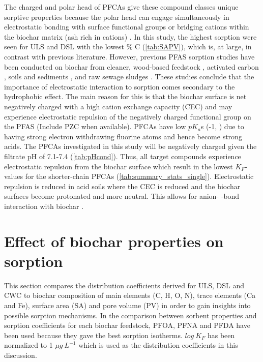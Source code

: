 The charged and polar head of PFCAs give these compound classes unique sorptive properties because the polar head can engage simultaneously in electrostatic bonding with surface functional groups or bridging cations within the biochar matrix (ash rich in cations) \citep{zhang2013sorption,sigmund2022sorption}. In this study, the highest sorption were seen for ULS and DSL with the lowest \% C (\cref{tab:SAPV}), which is, at large, in contrast with previous literature. However, previous PFAS sorption studies have been conducted on biochar from cleaner, wood-based feedstock \citep{Sormo2021}, activated carbon \citep{zhang2021sorption,Kupryianchyk2016b}, soils and sediments \citep{higgins2006sorption}, and raw sewage sludges \citep{zhang2013sorption}. These studies conclude that the importance of electrostatic interaction to sorption comes secondary to the hydrophobic effect. The main reason for this is that the biochar surface is net negatively charged with a high cation exchange capacity (CEC) \citep{Ahmad2014} and may experience electrostatic repulsion of the negatively charged functional group on the PFAS (Include PZC when available). PFCAs have low $pK_a$s (-1, \citep{goss2008pKa}) due to having strong electron withdrawing fluorine atoms and hence become strong acids. The PFCAs investigated in this study will be negatively charged given the filtrate pH of 7.1-7.4 (\cref{tab:pHcond}). Thus, all target compounds experience electrostatic repulsion from the biochar surface which result in the lowest $K_F$-values for the shorter-chain PFCAs (\cref{tab:summary_stats_single}). Electrostatic repulsion is reduced in acid soils where the CEC is reduced and the biochar surfaces become protonated and more neutral. This allows for anion- \textpi-bond interaction with biochar \citep{sigmund2022sorption}. 


\section{Effect of biochar properties on sorption}
This section compares the distribution coefficients derived for ULS, DSL and CWC to biochar composition of main elements (C, H, O, N), trace elements (Ca and Fe), surface area (SA) and pore volume (PV) in order to gain insights into possible sorption mechanisms. In the comparison between sorbent properties and sorption coefficients for each biochar feedstock, PFOA, PFNA and PFDA have been used because they gave the best sorption isotherms. $log~K_F$ has been normalized to 1 $\mu g~L^{-1}$ which is used as the distribution coefficients in this discussion.


